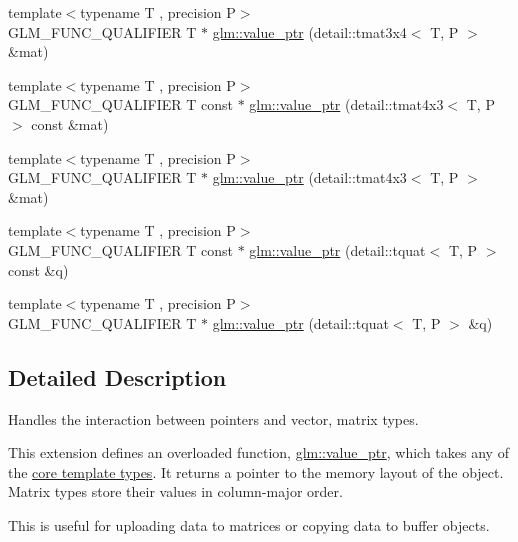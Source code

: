 \begin{DoxyCompactItemize}
\item 
{\footnotesize template$<$typename T , precision P$>$ }\\G\+L\+M\+\_\+\+F\+U\+N\+C\+\_\+\+Q\+U\+A\+L\+I\+F\+I\+ER T $\ast$ \hyperlink{group__gtc__type__ptr_gad8c6b1dbda2b48d19fd1bc8b01cf701c}{glm\+::value\+\_\+ptr} (detail\+::tmat3x4$<$ T, P $>$ \&mat)
\item 
{\footnotesize template$<$typename T , precision P$>$ }\\G\+L\+M\+\_\+\+F\+U\+N\+C\+\_\+\+Q\+U\+A\+L\+I\+F\+I\+ER T const $\ast$ \hyperlink{group__gtc__type__ptr_gaebe5b66d8b05f6ace85d26cedd03732d}{glm\+::value\+\_\+ptr} (detail\+::tmat4x3$<$ T, P $>$ const \&mat)
\item 
{\footnotesize template$<$typename T , precision P$>$ }\\G\+L\+M\+\_\+\+F\+U\+N\+C\+\_\+\+Q\+U\+A\+L\+I\+F\+I\+ER T $\ast$ \hyperlink{group__gtc__type__ptr_ga4a4b23867cc26441441ff4458844fa27}{glm\+::value\+\_\+ptr} (detail\+::tmat4x3$<$ T, P $>$ \&mat)
\item 
{\footnotesize template$<$typename T , precision P$>$ }\\G\+L\+M\+\_\+\+F\+U\+N\+C\+\_\+\+Q\+U\+A\+L\+I\+F\+I\+ER T const $\ast$ \hyperlink{group__gtc__type__ptr_ga961a5b150a0ffd632aaa0252c4d6b9ab}{glm\+::value\+\_\+ptr} (detail\+::tquat$<$ T, P $>$ const \&q)
\item 
{\footnotesize template$<$typename T , precision P$>$ }\\G\+L\+M\+\_\+\+F\+U\+N\+C\+\_\+\+Q\+U\+A\+L\+I\+F\+I\+ER T $\ast$ \hyperlink{group__gtc__type__ptr_gab72389186ae9e8c822ff6cc9b474a37f}{glm\+::value\+\_\+ptr} (detail\+::tquat$<$ T, P $>$ \&q)
\end{DoxyCompactItemize}


\subsection{Detailed Description}
Handles the interaction between pointers and vector, matrix types. 

This extension defines an overloaded function, \hyperlink{group__gtc__type__ptr_gaf019636bb8bd7c9efb7c7ce3bb23bcfc}{glm\+::value\+\_\+ptr}, which takes any of the \hyperlink{group__core__template}{core template types}. It returns a pointer to the memory layout of the object. Matrix types store their values in column-\/major order.

This is useful for uploading data to matrices or copying data to buffer objects.

